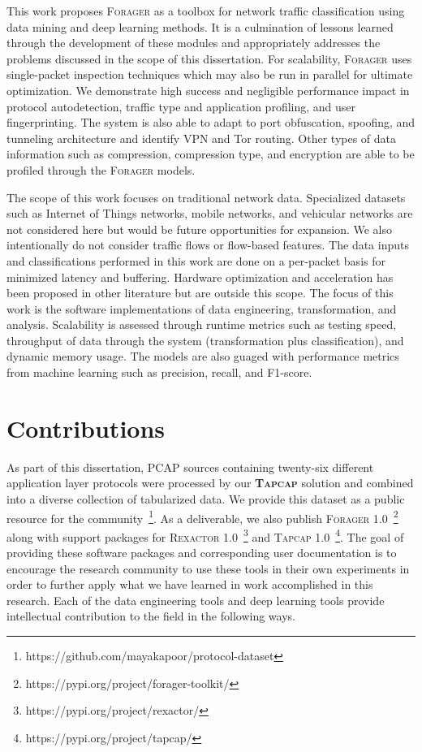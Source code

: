 This work proposes \textsc{Forager} as a toolbox for network traffic classification using data mining and deep learning methods. It is a culmination of lessons learned through the development of these modules and appropriately addresses the problems discussed in the scope of this dissertation. For scalability, \textsc{Forager} uses single-packet inspection techniques which may also be run in parallel for ultimate optimization. We demonstrate high success and negligible performance impact in protocol autodetection, traffic type and application profiling, and user fingerprinting. The system is also able to adapt to port obfuscation, spoofing, and tunneling architecture and identify VPN and Tor routing. Other types of data information such as compression, compression type, and encryption are able to be profiled through the \textsc{Forager} models.

The scope of this work focuses on traditional network data. Specialized datasets such as Internet of Things networks, mobile networks, and vehicular networks are not considered here but would be future opportunities for expansion. We also intentionally do not consider traffic flows or flow-based features. The data inputs and classifications performed in this work are done on a per-packet basis for minimized latency and buffering. Hardware optimization and acceleration has been proposed in other literature but are outside this scope. The focus of this work is the software implementations of data engineering, transformation, and analysis. Scalability is assessed through runtime metrics such as testing speed, throughput of data through the system (transformation plus classification), and dynamic memory usage. The models are also guaged with performance metrics from machine learning such as precision, recall, and F1-score.

\section{Contributions}

As part of this dissertation, PCAP sources containing twenty-six different application layer protocols were processed by our \textbf{\textsc{Tapcap}} solution and combined into a diverse collection of tabularized data. We provide this dataset as a public resource for the community~\footnote{https://github.com/mayakapoor/protocol-dataset}. As a deliverable, we also publish \textsc{Forager 1.0}~\footnote{https://pypi.org/project/forager-toolkit/} along with support packages for \textsc{Rexactor 1.0}~\footnote{https://pypi.org/project/rexactor/} and \textsc{Tapcap 1.0}~\footnote{https://pypi.org/project/tapcap/}. The goal of providing these software packages and corresponding user documentation is to encourage the research community to use these tools in their own experiments in order to further apply what we have learned in work accomplished in this research. Each of the data engineering tools and deep learning tools provide intellectual contribution to the field in the following ways.


